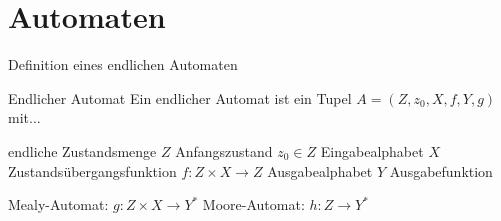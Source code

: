 %
%	
%	
%	
%	
%	


\section{Automaten}

\begin{frame}{Definition eines endlichen Automaten}
	\begin{block}{Endlicher Automat}
		Ein endlicher Automat ist ein Tupel $A = (Z, z_0, X, f, Y, g)$ mit...
		
		\begin{itemize}
			\pitem endliche Zustandsmenge $Z$
			\pitem Anfangszustand $z_0 \in Z$
			\pitem Eingabealphabet $X$
			\pitem Zustandsübergangsfunktion $f: Z \times X \rightarrow Z$
			\pitem Ausgabealphabet $Y$
			\pitem Ausgabefunktion 
			\begin{itemize}
				\pitem Mealy-Automat: $g: Z \times X \rightarrow Y^*$
				\pitem Moore-Automat: $h: Z \rightarrow Y^*$
			\end{itemize}
		\end{itemize}
	\end{block}
\end{frame}

